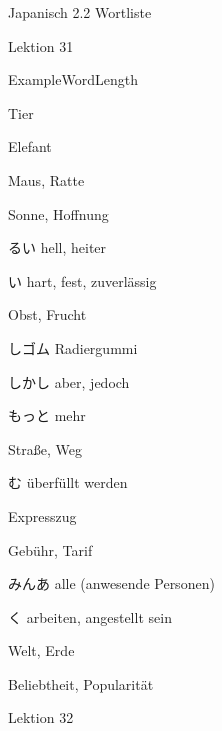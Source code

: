 \noindent
\centering
Japanisch 2.2 Wortliste

Lektion 31

\begin{multicols}{2}
\begin{flushleft}
\begin{labeling}{ExampleWordLength}
	\item [\ruby{動物}{どうぶつ}] Tier
	\item [\ruby{象}{ぞう}] Elefant
	\item [\ruby{鼠}{ねずみ}] Maus, Ratte
	\item [\ruby{太陽}{たいよう}] Sonne, Hoffnung
	\item [\ruby{明}{あか}るい] hell, heiter
	\item [\ruby{硬}{かた}い] hart, fest, zuverlässig
	\item [\ruby{果物}{くだもの}] Obst, Frucht
	\item [\ruby{消}{け}しゴム] Radiergummi
	
	\item [しかし] aber, jedoch
	\item [もっと] mehr
	\item [\ruby{道路}{どうる}] Straße, Weg
	\item [\ruby{込}{こ}む] überfüllt werden
	\item [\ruby{特急電車}{とっきゅうでんしゃ}] Expresszug
	\item [\ruby{料金}{りょうきん}] Gebühr, Tarif
	\item [みんあ] alle (anwesende Personen)
	\item [\ruby{働}{はたら}く] arbeiten, angestellt sein
	\item [\ruby{世界}{せかい}] Welt, Erde
	\item [\ruby{人気}{にんき}] Beliebtheit, Popularität
\end{labeling}
\end{flushleft}
\end{multicols}

Lektion 32

